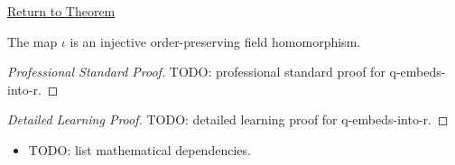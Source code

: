 \newpage
{}
\label{prf:q-embeds-into-r}

\begin{remark*}[Return]
\hyperref[thm:q-embeds-into-r]{Return to Theorem}
\end{remark*}

\begin{theorem*}
The map $\iota$ is an injective order-preserving field homomorphism.
\end{theorem*}

\begin{proof}[Professional Standard Proof]
\LRAProofBodyStart
TODO: professional standard proof for q-embeds-into-r.
\end{proof}

\begin{proof}[Detailed Learning Proof]
\LRAProofBodyStart
TODO: detailed learning proof for q-embeds-into-r.
\end{proof}

\begin{remark*}
\end{remark*}

\begin{dependencies}
\begin{itemize}
  \item TODO: list mathematical dependencies.
\end{itemize}
\end{dependencies}

\clearpage
